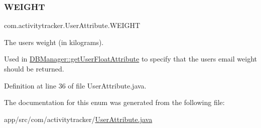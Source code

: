 \mbox{\label{enumcom_1_1activitytracker_1_1_user_attribute_a024206b0dc3261031ef586b3f0fd530c}} 
\subsubsection{\texorpdfstring{WEIGHT}{WEIGHT}}
{\footnotesize\ttfamily com.\+activitytracker.\+User\+Attribute.\+W\+E\+I\+G\+HT}

The user\textquotesingle{}s weight (in kilograms).

Used in \mbox{\hyperlink{classcom_1_1activitytracker_1_1_d_b_manager_a98df66254bec4d74b29cfe468a9fc794}{D\+B\+Manager\+::get\+User\+Float\+Attribute}} to specify that the user\textquotesingle{}s email weight should be returned. 

Definition at line 36 of file User\+Attribute.\+java.



The documentation for this enum was generated from the following file\+:\begin{DoxyCompactItemize}
\item 
app/src/com/activitytracker/\mbox{\hyperlink{_user_attribute_8java}{User\+Attribute.\+java}}\end{DoxyCompactItemize}
